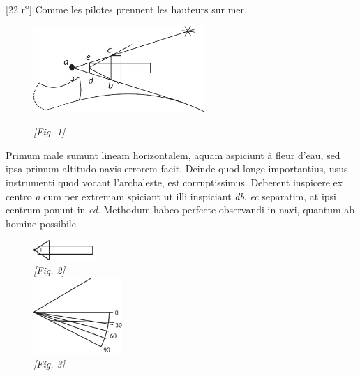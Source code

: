                 \vspace*{8mm}
                \pstart 
                \normalsize
            \begin{center}%
            [22 r\textsuperscript{o}] Comme les pilotes prennent les hauteurs sur mer.\end{center}\pend   \vspace{1.0ex}\pstart %
              \begin{figure}                    
              \includegraphics[width=0.58\textwidth]{images/38_22r3}
              \\\begin{center}\textit{[Fig. 1]}\end{center} 
              \end{figure}
            Primum male sumunt lineam horizontalem, aquam aspiciunt \`{a} fleur d'eau, sed ipsa primum altitudo  navis errorem facit. Deinde quod longe  importantius, usus instrumenti quod vocant l'arcbaleste\protect{}, est corruptissimus.  Deberent inspicere ex centro \textit{a} cum per extremam spiciant  ut illi inspiciant \textit{db}, \textit{ec} separatim, at ipsi centrum ponunt in  {} \textit{ed}. \pend \pstart Methodum habeo perfecte observandi in navi, quantum ab homine possibile
              \begin{figure} 
              \begin{center}                   
              \includegraphics[width=0.2\textwidth]{images/38_22r1}
              \\\textit{[Fig. 2]}\\
              \vspace{0.5ex}                   
              \includegraphics[width=0.3\textwidth]{images/38_22r2}
              \\\textit{[Fig. 3]}
              \end{center}
              \end{figure}
